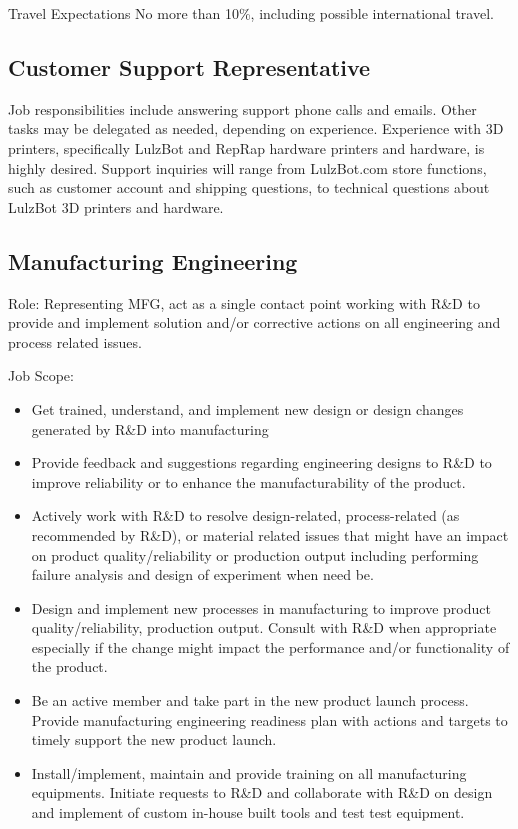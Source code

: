 Travel Expectations
No more than 10\%, including possible international travel.

\subsection{Customer Support Representative}
Job responsibilities include answering support phone calls and emails. Other tasks may be delegated as needed, depending on experience. Experience with 3D printers, specifically LulzBot and RepRap hardware printers and hardware, is highly desired. Support inquiries will range from LulzBot.com store functions, such as customer account and shipping questions, to technical questions about LulzBot 3D printers and hardware.

\subsection{Manufacturing Engineering}
Role: Representing MFG, act as a single contact point working with R\&D to provide and implement solution and/or corrective actions on all engineering and process related issues.

Job Scope:
\begin{itemize}
 \item Get trained, understand, and implement new design or design changes generated by R\&D into manufacturing
 \item Provide feedback and suggestions regarding engineering designs to R\&D to improve reliability or to enhance the manufacturability of the product.
 \item Actively work with R\&D to resolve design-related, process-related (as recommended by R\&D), or material related issues that might have an impact on product quality/reliability or production output including performing failure analysis and design of experiment when need be.
 \item Design and implement new processes in manufacturing to improve product quality/reliability, production output. Consult with R\&D when appropriate especially if the change might impact the performance and/or functionality of the product.
 \item Be an active member and take part in the new product launch process. Provide manufacturing engineering readiness plan with actions and targets to timely support the new product launch.
 \item Install/implement, maintain and provide training on all manufacturing equipments. Initiate requests to R\&D and collaborate with R\&D on design and implement of custom in-house built tools and test test equipment.
\end{itemize}

